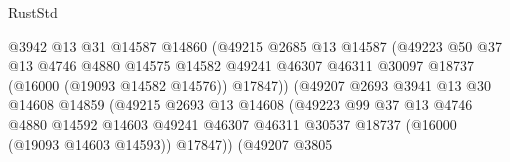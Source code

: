 \begin{lexlean}{RustStd}
\begin{coremodule}
                                        @3942
                                        @13
                                        @31
                                        @14587
                                        @14860
                                        (@49215
                                          @2685
                                          @13
                                          @14587
                                          (@49223
                                            @50
                                            @37
                                            @13
                                            @4746
                                            @4880
                                            @14575
                                            @14582
                                            @49241
                                            @46307
                                            @46311
                                            @30097
                                            @18737
                                            (@16000 (@19093 @14582 @14576))
                                            @17847))
                                        (@49207
                                          @2693
                                          @3941
                                          @13
                                          @30
                                          @14608
                                          @14859
                                          (@49215
                                            @2693
                                            @13
                                            @14608
                                            (@49223
                                              @99
                                              @37
                                              @13
                                              @4746
                                              @4880
                                              @14592
                                              @14603
                                              @49241
                                              @46307
                                              @46311
                                              @30537
                                              @18737
                                              (@16000 (@19093 @14603 @14593))
                                              @17847))
                                          (@49207
                                            @3805

\end{coremodule}
\end{lexlean}
